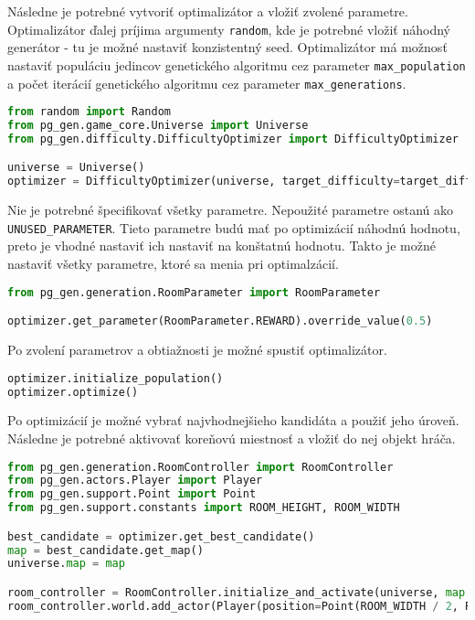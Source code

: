 Následne je potrebné vytvoriť optimalizátor a vložiť zvolené parametre. Optimalizátor ďalej príjima argumenty \texttt{random}, kde je potrebné vložiť náhodný generátor - tu je možné nastaviť konzistentný seed. Optimalizátor má možnosť nastaviť populáciu jedincov genetického algoritmu cez parameter \texttt{max\_population} a počet iterácií genetického algoritmu cez parameter \texttt{max\_generations}.

\begin{lstlisting}[language=python]
from random import Random
from pg_gen.game_core.Universe import Universe
from pg_gen.difficulty.DifficultyOptimizer import DifficultyOptimizer

universe = Universe()
optimizer = DifficultyOptimizer(universe, target_difficulty=target_difficulty, random=Random(108561))
\end{lstlisting}

Nie je potrebné špecifikovať všetky parametre. Nepoužité parametre ostanú ako \texttt{UNUSED\_PARAMETER}. Tieto parametre budú mať po optimizácií náhodnú hodnotu, preto je vhodné nastaviť ich nastaviť na konštatnú hodnotu. Takto je možné nastaviť všetky parametre, ktoré sa menia pri optimalzácií.

\begin{lstlisting}[language=python]
from pg_gen.generation.RoomParameter import RoomParameter

optimizer.get_parameter(RoomParameter.REWARD).override_value(0.5)
\end{lstlisting}

Po zvolení parametrov a obtiažnosti je možné spustiť optimalizátor.

\begin{lstlisting}[language=python]
optimizer.initialize_population()
optimizer.optimize()
\end{lstlisting}

Po optimizácií je možné vybrať najvhodnejšieho kandidáta a použiť jeho úroveň. Následne je potrebné aktivovať koreňovú miestnosť a vložiť do nej objekt hráča.

\begin{lstlisting}[language=python]
from pg_gen.generation.RoomController import RoomController
from pg_gen.actors.Player import Player
from pg_gen.support.Point import Point
from pg_gen.support.constants import ROOM_HEIGHT, ROOM_WIDTH

best_candidate = optimizer.get_best_candidate()
map = best_candidate.get_map()
universe.map = map

room_controller = RoomController.initialize_and_activate(universe, map.get_room(Point.ZERO), None)
room_controller.world.add_actor(Player(position=Point(ROOM_WIDTH / 2, ROOM_HEIGHT / 2)))
\end{lstlisting}

